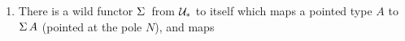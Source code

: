 \documentclass[english,a4]{article}
\renewcommand{\ap}[1]{\left[{#1}\right]}
\newcommand{\UUptd}{\UU_{\ast}}
\begin{document}
\begin{example}
\begin{enumerate}
    \item There is a wild functor $\susp \null$ from $\UUptd$ to itself which
      maps a pointed type $A$ to $\operatorname{\Sigma} A$ (pointed at the pole $N$), and maps

\end{enumerate}
\end{example}
\end{document}
